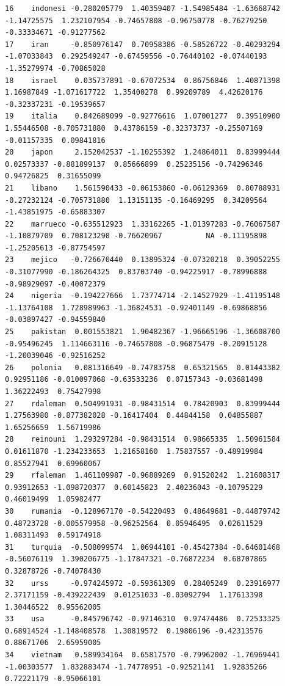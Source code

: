\documentclass[12pt,twoside]{report}
\begin{document}
\begin{verbatim}
16    indonesi -0.280205779  1.40359407 -1.54985484 -1.63668742 -1.14725575  1.232107954 -0.74657808 -0.96750778 -0.76279250 -0.33334671 -0.91277562
17    iran     -0.850976147  0.70958386 -0.58526722 -0.40293294 -1.07033843  0.292549247 -0.67459556 -0.76440102 -0.07440193 -1.35279974 -0.70865028
18    israel    0.035737891 -0.67072534  0.86756846  1.40871398  1.16987849 -1.071617722  1.35400278  0.99209789  4.42620176 -0.32337231 -0.19539657
19    italia    0.842689099 -0.92776616  1.07001277  0.39510900  1.55446508 -0.705731880  0.43786159 -0.32373737 -0.25507169 -0.01157335  0.09841816
20    japon     2.152042537 -1.10255392  1.24864011  0.83999444  0.02573337 -0.881899137  0.85666899  0.25235156 -0.74296346  0.94726825  0.31655099
21    libano    1.561590433 -0.06153860 -0.06129369  0.80788931 -0.27232124 -0.705731880  1.13151135 -0.16469295  0.34209564 -1.43851975 -0.65883307
22    marrueco -0.635512923  1.33162265 -1.01397283 -0.76067587 -1.10879709  0.708123290 -0.76620967          NA -0.11195898 -1.25205613 -0.87754597
23    mejico   -0.726670440  0.13895324 -0.07320218  0.39052255 -0.31077990 -0.186264325  0.83703740 -0.94225917 -0.78996888 -0.98929097 -0.40072379
24    nigeria  -0.194227666  1.73774714 -2.14527929 -1.41195148 -1.13764108  1.728989963 -1.36824531 -0.92401149 -0.69868856 -0.03897427 -0.94559840
25    pakistan  0.001553821  1.90482367 -1.96665196 -1.36608700 -0.95496245  1.114663116 -0.74657808 -0.96875479 -0.20915128 -1.20039046 -0.92516252
26    polonia   0.081316649 -0.74783758  0.65321565  0.01443382  0.92951186 -0.010097068 -0.63533236  0.07157343 -0.03681498  1.36222493  0.75427998
27    rdaleman  0.504991931 -0.98431514  0.78420903  0.83999444  1.27563980 -0.877382028 -0.16417404  0.44844158  0.04855887  1.65256659  1.56719986
28    reinouni  1.293297284 -0.98431514  0.98665335  1.50961584  0.01611870 -1.234233653  1.21658160  1.75837557 -0.48919984  0.85527941  0.69960067
29    rfaleman  1.461109987 -0.96889269  0.91520242  1.21608317  0.93912653 -1.098720377  0.60145823  2.40236043 -0.10795229  0.46019499  1.05982477
30    rumania  -0.128967170 -0.54220493  0.48649681 -0.44879742  0.48723728 -0.005579958 -0.96252564  0.05946495  0.02611529  1.08311493  0.59174918
31    turquia  -0.508099574  1.06944101 -0.45427384 -0.64601468 -0.56076119  1.390206775 -1.17847321 -0.76872234  0.68707865  0.32878726 -0.74078430
32    urss     -0.974245972 -0.59361309  0.28405249  0.23916977  2.37171159 -0.439222439  0.01251033 -0.03092794  1.17613398  1.30446522  0.95562005
33    usa      -0.845796742 -0.97146310  0.97474486  0.72533325  0.68914524 -1.148408578  1.30819572  0.19806196 -0.42313576  0.88671706  2.65959005
34    vietnam   0.589934164  0.65817570 -0.79962002 -1.76969441 -1.00303577  1.832883474 -1.74778951 -0.92521141  1.92835266  0.72221179 -0.95066101
\end{verbatim}
\end{document}
